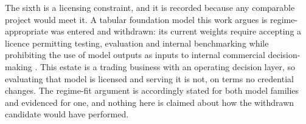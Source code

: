 The sixth is a licensing constraint, and it is recorded because any comparable project would
meet it. A tabular foundation model this work argues is
regime-appropriate \citep{hollmann_accurate_2025} was entered and withdrawn: its current weights
require accepting a licence permitting testing, evaluation and internal benchmarking while
prohibiting the use of model outputs as inputs to internal commercial decision-making
\citep{grinsztajn_tabpfn-3_2026}. This estate is a trading business with an operating decision
layer, so evaluating that model is licensed and serving it is not, on terms no credential
changes. The regime-fit argument is accordingly stated for both model families and evidenced for
one, and nothing here is claimed about how the withdrawn candidate would have performed.
